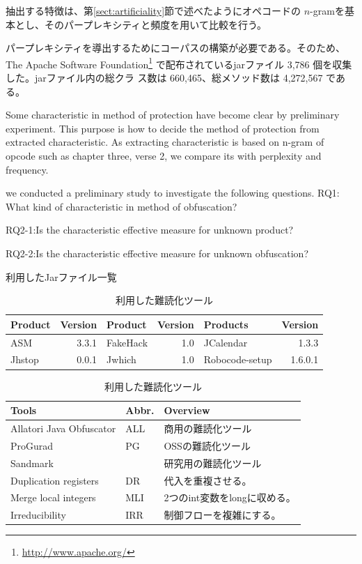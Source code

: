 \documentclass[conference]{IEEEtran}
\begin{document}
抽出する特徴は、第\ref{sect:artificiality}節で述べたようにオペコードの
$n$-gramを基本とし、そのパープレキシティと頻度を用いて比較を行う。

パープレキシティを導出するためにコーパスの構築が必要である。そのため、
The Apache Software Foundation\footnote{\url{http://www.apache.org/}}
で配布されているjarファイル 3,786 個を収集した。jarファイル内の総クラ
ス数は 660,465、総メソッド数は 4,272,567 である。

Some characteristic in method of protection have become clear by
preliminary experiment.  This purpose is how to decide the method of
protection from extracted characteristic.  As extracting
characteristic is based on n-gram of opcode such as chapter three,
verse 2, we compare its with perplexity and frequency.

we conducted a preliminary study to investigate the following
questions.  RQ1: What kind of characteristic in method of obfuscation?

RQ2-1:Is the characteristic effective measure for unknown product?

RQ2-2:Is the characteristic effective measure for unknown obfuscation?

\begin{table}[t]
  \centering
  \footnotesize{
    \caption{利用したJarファイル一覧}\label{table:jars}
  \begin{tabular}{l|r||l|r||l|r}
    Product & Version & Product & Version & Products & Version \\ \hline
    ASM       & 3.3.1 & FakeHack  & 1.0 &JCalendar & 1.3.3   \\
    Jhstop    & 0.0.1 & Jwhich    & 1.0   & Robocode-setup & 1.6.0.1 
  \end{tabular}
  \caption{利用した難読化ツール}\label{table:tools}
  \begin{tabular}{ll|l}
      Tools & Abbr. & Overview \\ \hline
      Allatori Java Obfuscator & ALL & 商用の難読化ツール \\ \hline
      ProGurad                 & PG & OSSの難読化ツール \\ \hline
      Sandmark                 & & 研究用の難読化ツール \\
      \hspace{0.2cm} Duplication registers & DR & 代入を重複させる。\\
      \hspace{0.2cm} Merge local integers & MLI & 2つのint変数をlongに収める。\\
      \hspace{0.2cm} Irreducibility       & IRR & 制御フローを複雑にする。\\
  \end{tabular}}
\end{table}
\end{document}
